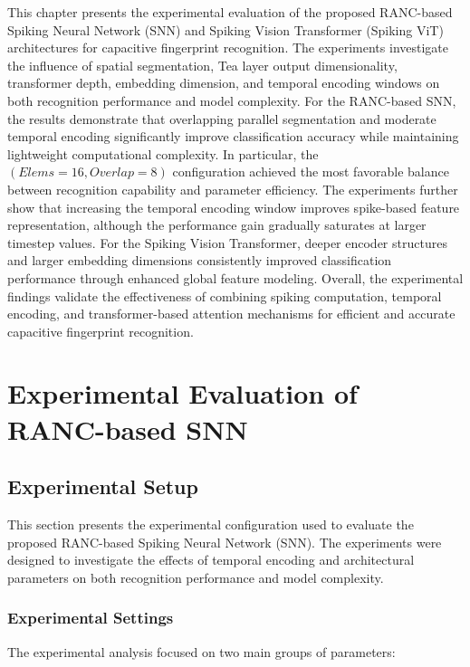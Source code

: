 \documentclass[../main.tex]{subfiles}
\begin{document}
This chapter presents the experimental evaluation of the proposed RANC-based Spiking Neural Network (SNN) and Spiking Vision Transformer (Spiking ViT) architectures for capacitive fingerprint recognition. The experiments investigate the influence of spatial segmentation, Tea layer output dimensionality, transformer depth, embedding dimension, and temporal encoding windows on both recognition performance and model complexity. For the RANC-based SNN, the results demonstrate that overlapping parallel segmentation and moderate temporal encoding significantly improve classification accuracy while maintaining lightweight computational complexity. In particular, the \((\textit{Elems}=16, \textit{Overlap}=8)\) configuration achieved the most favorable balance between recognition capability and parameter efficiency. The experiments further show that increasing the temporal encoding window improves spike-based feature representation, although the performance gain gradually saturates at larger timestep values. For the Spiking Vision Transformer, deeper encoder structures and larger embedding dimensions consistently improved classification performance through enhanced global feature modeling. Overall, the experimental findings validate the effectiveness of combining spiking computation, temporal encoding, and transformer-based attention mechanisms for efficient and accurate capacitive fingerprint recognition.

\section{Experimental Evaluation of RANC-based SNN}
\label{sec:Experimental-Evaluation-of-RANC-based-SNN}
\subsection{Experimental Setup}

This section presents the experimental configuration used to evaluate the proposed RANC-based Spiking Neural Network (SNN). The experiments were designed to investigate the effects of temporal encoding and architectural parameters on both recognition performance and model complexity.

\subsubsection{Experimental Settings}

The experimental analysis focused on two main groups of parameters:
\end{document}
